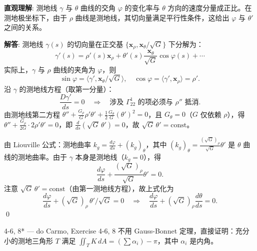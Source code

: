 \begin{solution}
\textbf{直观理解}: 测地线 $\gamma$ 与 $\theta$ 曲线的交角 $\varphi$ 的变化率与 $\theta$ 方向的速度分量成正比。在测地极坐标下，由于 $\rho$ 曲线是测地线，其切向量满足平行性条件，这给出 $\varphi$ 与 $\theta'$ 之间的关系。

\textbf{解答}: 测地线 $\gamma(s)$ 的切向量在正交基 $\{\mathbf{x}_\rho,\mathbf{x}_\theta/\sqrt{G}\}$ 下分解为：
\[
\gamma'(s) = \rho'(s)\mathbf{x}_\rho + \theta'(s)\frac{\mathbf{x}_\theta}{\sqrt{G}}\cos\varphi(s) + \cdots
\]
实际上，$\gamma$ 与 $\rho$ 曲线的夹角为 $\varphi$，则
\[
\sin\varphi = \langle \gamma', \mathbf{x}_\theta/\sqrt{G}\rangle,\quad
\cos\varphi = \langle \gamma', \mathbf{x}_\rho\rangle = \rho'.
\]
沿 $\gamma$ 的测地线方程（取第一分量）：
\[
\frac{D\gamma'}{ds} = 0 \quad\Longrightarrow\quad \text{涉及 } \Gamma_{22}^1 \text{ 的项必须与 } \rho'' \text{ 抵消}.
\]
由测地线第二方程 $\theta'' + \frac{G_\rho}{G}\rho'\theta' + \frac{1}{2}\frac{G_\theta}{G}(\theta')^2 = 0$，且 $G_\theta=0$（$G$ 仅依赖 $\rho$），得 $\theta'' + \frac{G_\rho}{2G}\cdot 2\rho'\theta' = 0$，即 $\frac{d}{ds}(\sqrt{G}\,\theta') = 0$，故 $\sqrt{G}\,\theta' = \mathrm{const}$。

由 Liouville 公式：测地曲率 $k_g = \frac{d\varphi}{ds} + (k_g)_\theta$，其中 $(k_g)_\theta = \frac{(\sqrt{G})_\rho}{\sqrt{G}}\theta'$ 是 $\theta$ 曲线的测地曲率。由于 $\gamma$ 本身是测地线（$k_g=0$），得
\[
\frac{d\varphi}{ds} + \frac{(\sqrt{G})_\rho}{\sqrt{G}}\theta' = 0.
\]
注意 $\sqrt{G}\,\theta' = \mathrm{const}$（由第一测地线方程），故上式化为
\[
\frac{d\varphi}{ds} + (\sqrt{G})_\rho\,\theta'/\sqrt{G} = 0\quad\Longrightarrow\quad
\frac{d\varphi}{ds} + (\sqrt{G})_\rho\frac{d\theta}{ds} = 0.
\]
\qed
\end{solution}

\begin{exercise}{4-6, 8* — do Carmo, Exercise 4-6, 8}
不用 Gauss-Bonnet 定理，直接证明：充分小的测地三角形 $T$ 满足 $\iint_T K\, dA = (\sum \alpha_i) - \pi$，其中 $\alpha_i$ 是内角。
\end{exercise}

